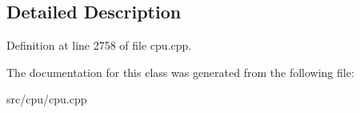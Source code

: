 \subsection{Detailed Description}


Definition at line 2758 of file cpu.\-cpp.



The documentation for this class was generated from the following file\-:\begin{DoxyCompactItemize}
\item 
src/cpu/cpu.\-cpp\end{DoxyCompactItemize}
